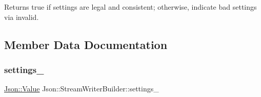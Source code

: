 \begin{DoxyReturn}{Returns}
true if \textquotesingle{}settings\textquotesingle{} are legal and consistent; otherwise, indicate bad settings via \textquotesingle{}invalid\textquotesingle{}. 
\end{DoxyReturn}


\subsection{Member Data Documentation}
\mbox{\label{classJson_1_1StreamWriterBuilder_a79bdf2e639a52f4e758c0b95bd1d3423}} 
\subsubsection{\texorpdfstring{settings\+\_\+}{settings\_}}
{\footnotesize\ttfamily \hyperlink{classJson_1_1Value}{Json\+::\+Value} Json\+::\+Stream\+Writer\+Builder\+::settings\+\_\+}

